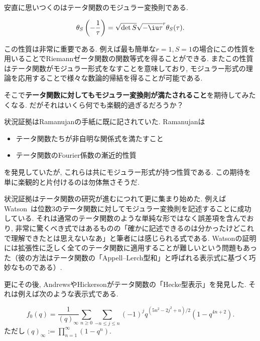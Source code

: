 \documentclass[11pt,b5paper,oneside,lualatex]{ltjsarticle} %
\numberwithin{equation}{section} %
\begin{document}
安直に思いつくのはテータ関数のモジュラー変換則である. 

\begin{prop}
	\[
	\theta_S \left( -\frac{1}{\tau} \right) =
	\sqrt{\det S} \sqrt{-\iu \tau}^r \theta_S (\tau).
	\]
\end{prop}

この性質は非常に重要である. 
例えば最も簡単な$ r = 1, S = 1 $の場合にこの性質を用いることでRiemannゼータ関数の関数等式を得ることができる. 
またこの性質はテータ関数がモジュラー形式をなすことを意味しており, モジュラー形式の理論を応用することで様々な数論的帰結を得ることが可能である. 

そこで\textbf{テータ関数に対してもモジュラー変換則が満たされること}を期待してみたくなる. 
だがそれはいくら何でも楽観的過ぎるだろうか？

状況証拠はRamanujanの手紙に既に記されていた. 
Ramanujanは
\begin{itemize}
	\item {}テータ関数たちが非自明な関係式を満たすこと
	\item {}テータ関数のFourier係数の漸近的性質
\end{itemize}
を発見していたが, これらは共にモジュラー形式が持つ性質である. 
この期待を単に楽観的と片付けるのは勿体無さそうだ. 

状況証拠はテータ関数の研究が進むにつれて更に集まり始めた. 
例えばWatson~\cite[pp. 78]{Watson}は位数$ 3 $のテータ関数に対してモジュラー変換則を記述することに成功している. 
それは通常のテータ関数のような単純な形ではなく誤差項を含んでおり, 非常に驚くべき式ではあるものの「確かに記述できるのは分かったけどこれで理解できたとは思えないなあ」と筆者には感じられる式である. 
Watsonの証明には拡張性に乏しく全てのテータ関数に適用することが難しいという問題もあった（彼の方法はテータ関数の「Appell--Lerch型和」と呼ばれる表示式に基づく巧妙なものである）. 

更にその後, AndrewsやHickersonがテータ関数の「Hecke型表示」を発見した. 
それは例えば次のような表示式である. 

\begin{thm}
	\[
	f_0 (q) = \frac{1}{(q)_\infty}
	\sum_{n \ge 0} \sum_{-n \le j \le n} (-1)^j q^{(5n^2 - 2j^2 + n)/2} (1 - q^{4n+2}).
	\]
	ただし$ (q)_\infty := \prod_{n=1}^{\infty} (1 - q^n) $.
\end{thm}
\end{document}
